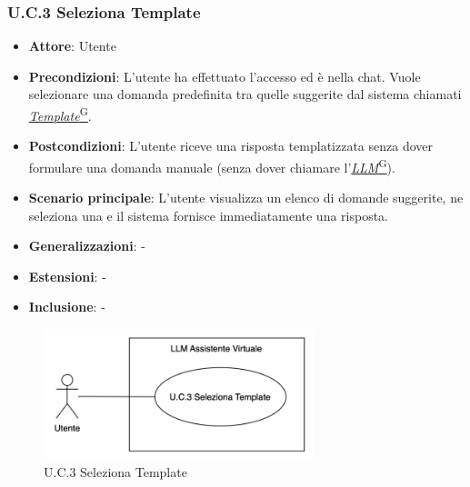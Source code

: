 \subsubsection{U.C.3 Seleziona Template}
\begin{itemize}
    \item \textbf{Attore}: Utente
    \item \textbf{Precondizioni}: L'utente ha effettuato l'accesso ed è nella chat. Vuole selezionare una domanda predefinita tra quelle suggerite dal sistema chiamati \href{https://code7crusaders.github.io/docs/PB/documentazione_interna/glossario.html#template}{\textit{Template}\textsuperscript{G}}. 
    \item \textbf{Postcondizioni}: L'utente riceve una risposta templatizzata senza dover formulare una domanda manuale (senza dover chiamare l’\href{https://code7crusaders.github.io/docs/PB/documentazione_interna/glossario.html#llm-large-language-model}{\textit{LLM}\textsuperscript{G}}).
    \item \textbf{Scenario principale}: L'utente visualizza un elenco di domande suggerite, ne seleziona una e il sistema fornisce immediatamente una risposta.
    \item \textbf{Generalizzazioni}: -
    \item \textbf{Estensioni}: -
    \item \textbf{Inclusione}: -
\end{itemize}
\begin{figure}[H]
    \centering
    \includegraphics[width=0.7\textwidth]{img/UC3.png}
    \caption{U.C.3 Seleziona Template}
\end{figure}
\newpage

